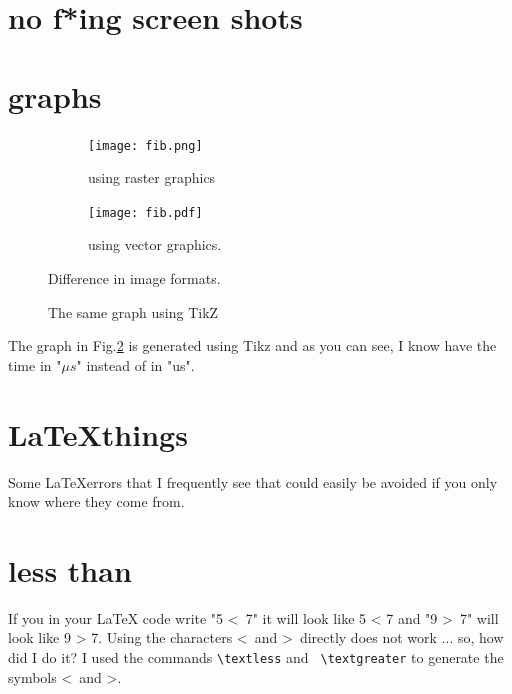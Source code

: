 \documentclass[a4paper,11pt]{article}
\begin{document}
\section*{no f*ing screen shots}

\section*{graphs}

\begin{figure}[h]
  \centering
  \begin{subfigure}{.5\textwidth}
    \centering
    \texttt{[image: fib.png]}
    \caption{using raster graphics}
  \end{subfigure}%
  \begin{subfigure}{.5\textwidth}
    \centering
    \texttt{[image: fib.pdf]}
    \caption{using vector graphics.}
  \end{subfigure}
  \caption{Difference in image formats.}
  \label{fig:images}
\end{figure}

\begin{figure}
  \centering
  \caption{The same graph using TikZ}
  \label{fig:tikz}
\end{figure}

The graph in Fig.\ref{fig:tikz} is generated using Tikz and as you can
see, I know have the time in "$\mu s$" instead of in "us".


\section*{\LaTeX things}

Some \LaTeX errors that I frequently see that could easily be avoided
if you only know where they come from.

\section*{less than}

If you in your LaTeX code write "5 \textless\ 7" it will look like 5 <
7 and "9 \textgreater\ 7" will look like 9 > 7. Using the characters
\textless\ and \textgreater\ directly does not work ... so, how did I
do it?  I used the commands {\tt  \textbackslash textless} and {\tt
  \textbackslash textgreater} to generate the symbols \textless\ and
\textgreater.
\end{document}
